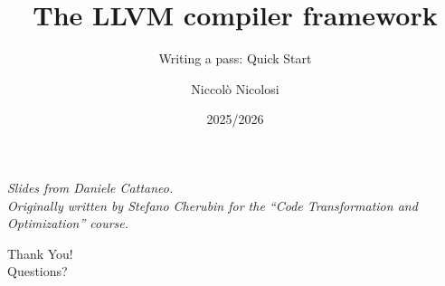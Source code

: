

\author{Niccolò Nicolosi}
\date{2025/2026}
\title{The LLVM compiler framework}
\subtitle{Writing a pass: Quick Start}
\newcommand{\customdata}{Niccolò Nicolosi}






\begin{frame}
\maketitle
\begin{center}
\itshape\scriptsize
Slides from Daniele Cattaneo.\\
Originally written by
Stefano Cherubin for the
``Code Transformation and Optimization'' course.
\end{center}
\end{frame}






\begin{frame}{}
\Huge\centering
Thank You!\\
\bigskip
\normalsize
Questions?
\end{frame}



